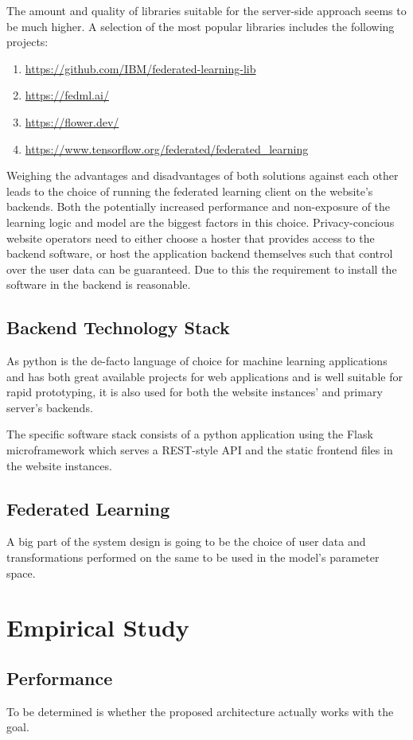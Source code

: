 \documentclass[
    fontsize=12pt,
    headings=small,
    parskip=half,           %
    bibliography=totoc,
    numbers=noenddot,       %
    open=any,               %
    ]{scrreprt}
\begin{document}
The amount and quality of libraries suitable for the server-side approach seems to be much higher. A selection of the most popular libraries includes the following projects:

\begin{enumerate}
	\item \url{https://github.com/IBM/federated-learning-lib}
	\item \url{https://fedml.ai/}
	\item \url{https://flower.dev/}
	\item \url{https://www.tensorflow.org/federated/federated_learning}
\end{enumerate}

Weighing the advantages and disadvantages of both solutions against each other leads to the choice of running the federated learning client on the website's backends. Both the potentially increased performance and non-exposure of the learning logic and model are the biggest factors in this choice. Privacy-concious website operators need to either choose a hoster that provides access to the backend software, or host the application backend themselves such that control over the user data can be guaranteed. Due to this the requirement to install the software in the backend is reasonable.

\section{Backend Technology Stack}

As python is the de-facto language of choice for machine learning applications and has both great available projects for web applications and is well suitable for rapid prototyping, it is also used for both the website instances' and primary server's backends.

The specific software stack consists of a python application using the Flask microframework which serves a REST-style API and the static frontend files in the website instances.


\section{Federated Learning}

A big part of the system design is going to be the choice of user data and transformations performed on the same to be used in the model's parameter space.


\chapter{Empirical Study}

\section{Performance}

To be determined is whether the proposed architecture actually works with the goal.

\fi


\begin{raggedright}
  \printbibliography
\end{raggedright}
\end{document}

